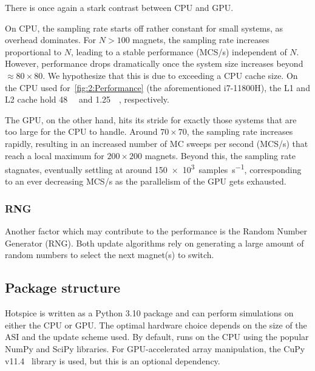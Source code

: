 There is once again a stark contrast between CPU and GPU. \par
On CPU, the sampling rate starts off rather constant for small systems, as overhead dominates.
For $N>100$ magnets, the sampling rate increases proportional to $N$, leading to a stable performance (MCS/s) independent of $N$.
However, performance drops dramatically once the system size increases beyond $\approx 80 \times 80$.
We hypothesize that this is due to exceeding a CPU cache size.
On the CPU used for~\cref{fig:2:Performance} (the aforementioned i7-11800H), the L1 and L2 cache hold \SI{48}{\kilo\byte} and \SI{1.25}{\mega\byte}, respectively. \par %
The GPU, on the other hand, hits its stride for exactly those systems that are too large for the CPU to handle.
Around $70 \times 70$, the sampling rate increases rapidly, resulting in an increased number of MC sweeps per second (MCS/s) that reach a local maximum for $200 \times 200$ magnets.
Beyond this, the sampling rate stagnates, eventually settling at around \SI{150e3}{samples\per\second}, corresponding to an ever decreasing MCS/s as the parallelism of the GPU gets exhausted.

\subsubsection{RNG}
Another factor which may contribute to the performance is the Random Number Generator (RNG).
Both update algorithms rely on generating a large amount of random numbers to select the next magnet(s) to switch. %

\subsection{Package structure} %
Hotspice is written as a Python 3.10 package and can perform simulations on either the CPU or GPU.
The optimal hardware choice depends on the size of the ASI and the update scheme used.
By default, \hotspice runs on the CPU using the popular NumPy and SciPy libraries.
For GPU-accelerated array manipulation, the CuPy v11.4~\cite{CuPy} library is used, but this is an optional dependency. \par
